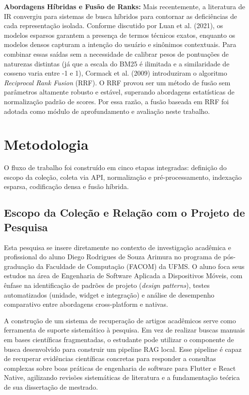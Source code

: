 \documentclass[12pt]{article}
\begin{document}
\noindent\textbf{Abordagens Híbridas e Fusão de Ranks:} Mais recentemente, a literatura de IR convergiu para sistemas de busca híbridos para contornar as deficiências de cada representação isolada. Conforme discutido por Luan et al. (2021), os modelos esparsos garantem a presença de termos técnicos exatos, enquanto os modelos densos capturam a intenção do usuário e sinônimos contextuais. Para combinar essas saídas sem a necessidade de calibrar pesos de pontuações de naturezas distintas (já que a escala do BM25 é ilimitada e a similaridade de cosseno varia entre -1 e 1), Cormack et al. (2009) introduziram o algoritmo \textit{Reciprocal Rank Fusion} (RRF). O RRF provou ser um método de fusão sem parâmetros altamente robusto e estável, superando abordagens estatísticas de normalização padrão de scores. Por essa razão, a fusão baseada em RRF foi adotada como módulo de aprofundamento e avaliação neste trabalho.

\section{Metodologia}

O fluxo de trabalho foi construído em cinco etapas integradas: definição do escopo da coleção, coleta via API, normalização e pré-processamento, indexação esparsa, codificação densa e fusão híbrida.

\subsection{Escopo da Coleção e Relação com o Projeto de Pesquisa}

Esta pesquisa se insere diretamente no contexto de investigação acadêmica e profissional do aluno Diego Rodrigues de Souza Arimura no programa de pós-graduação da Faculdade de Computação (FACOM) da UFMS. O aluno foca seus estudos na área de Engenharia de Software Aplicada a Dispositivos Móveis, com ênfase na identificação de padrões de projeto (\textit{design patterns}), testes automatizados (unidade, widget e integração) e análise de desempenho comparativo entre abordagens cross-platform e nativas. 

A construção de um sistema de recuperação de artigos acadêmicos serve como ferramenta de suporte sistemático à pesquisa. Em vez de realizar buscas manuais em bases científicas fragmentadas, o estudante pode utilizar o componente de busca desenvolvido para construir um pipeline RAG local. Esse pipeline é capaz de recuperar evidências científicas concretas para responder a consultas complexas sobre boas práticas de engenharia de software para Flutter e React Native, agilizando revisões sistemáticas de literatura e a fundamentação teórica de sua dissertação de mestrado.
\end{document}
